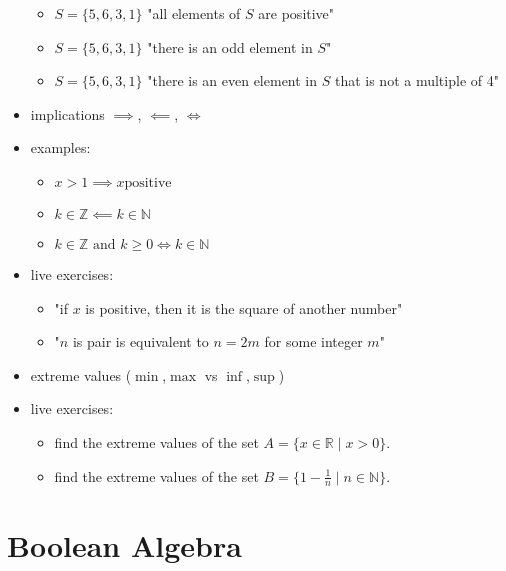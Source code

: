 \documentclass[a4paper,12pt]{article}
\providecommand{\tightlist}{\setlength{\itemsep}{0pt}\setlength{\parskip}{0pt}}
\newcommand{\N}{\mathbb{N}}
\newcommand{\Z}{\mathbb{Z}}
\newcommand{\R}{\mathbb{R}}
\newcommand{\txtand}{\text{ and }}
\begin{document}
\begin{itemize}
	\begin{itemize}
		\tightlist
		\item
		\(S = \{5,6,3,1\}\) "all elements of \(S\) are positive"
		\item
		\(S = \{5,6,3,1\}\) "there is an odd element in \(S\)"
		\item
		\(S = \{5,6,3,1\}\) "there is an even element in \(S\) that is not a
		multiple of 4"
	\end{itemize}
	\item
	implications \(\implies\), \(\impliedby\), \(\iff\)
	\item
	examples:
	
	\begin{itemize}
		\tightlist
		\item
		\(x>1 \implies x \text{positive}\)
		\item
		\(k \in \Z \impliedby k \in \N\)
		\item
		\(k \in \Z  \txtand k\geq 0 \iff k \in \N\)
	\end{itemize}
	\item
	live exercises:
	
	\begin{itemize}
		\tightlist
		\item
		"if \(x\) is positive, then it is the square of another number"
		\item
		"\(n\) is pair is equivalent to \(n=2m\) for some integer \(m\)"
	\end{itemize}
	\item
	extreme values (\(\min\),\(\max\) vs \(\inf\),\(\sup\))
	\item
	live exercises:
	
	\begin{itemize}
		\tightlist
		\item
		find the extreme values of the set \(A = \{x \in \R \mid x>0\}\).
		\item
		find the extreme values of the set
		\(B = \{1-\frac{1}{n} \mid n\in \N\}\).
	\end{itemize}
	\end{itemize}
	
	
	
	
	
	
	\hypertarget{boolean-algebra}{%
	\section{Boolean Algebra}\label{boolean-algebra}}
	
\end{document}
